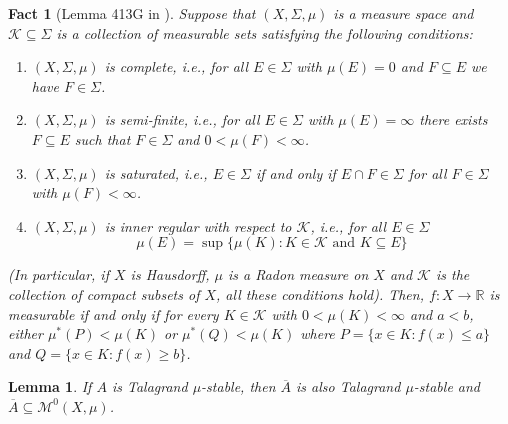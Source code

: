 \documentclass[psamsfonts]{amsart}
\newtheorem{lem}[thm]{Lemma}
\newtheorem{fact}[thm]{Fact}
\theoremstyle{definition}
\theoremstyle{remark}
\numberwithin{equation}{section}
\begin{document}
\begin{fact}[Lemma 413G in \cite{fremlin2003vol4}]\label{fact: measurable functions characterization}
    Suppose that $(X,\Sigma,\mu)$ is a measure space and $\mathcal{K}\subseteq\Sigma$ is a collection of measurable sets satisfying the following conditions:
    \begin{enumerate}
        \item $(X,\Sigma,\mu)$ is complete, i.e., for all $E\in\Sigma$ with $\mu(E)=0$ and $F\subseteq E$ we have $F\in\Sigma$.
        \item $(X,\Sigma,\mu)$ is semi-finite, i.e., for all $E\in\Sigma$ with $\mu(E)=\infty$ there exists $F\subseteq E$ such that $F\in\Sigma$ and $0<\mu(F)<\infty$.
        \item $(X,\Sigma,\mu)$ is saturated, i.e., $E\in\Sigma$ if and only if $E\cap F\in\Sigma$ for all $F\in\Sigma$ with $\mu(F)<\infty$.
        \item $(X,\Sigma,\mu)$ is inner regular with respect to $\mathcal{K}$, i.e., for all $E\in\Sigma$
        $$\mu(E)=\sup\{\mu(K):K\in\mathcal{K} \text{ and } K\subseteq E\}$$
    \end{enumerate}
    (In particular, if $X$ is Hausdorff, $\mu$ is a Radon measure on $X$ and $\mathcal{K}$ is the collection of compact subsets of $X$, all these conditions hold).
    Then, $f:X\rightarrow\mathbb{R}$ is measurable if and only if for every $K\in\mathcal{K}$ with $0<\mu(K)<\infty$ and $a<b$, either $\mu^*(P)<\mu(K)$ or $\mu^*(Q)<\mu(K)$ where $P=\{x\in K:f(x)\leq a\}$ and $Q=\{x\in K:f(x)\geq b\}$.
\end{fact}

\begin{lem}\label{talagrand stable is relatively compact}
    If $A$ is Talagrand $\mu$-stable, then $\overline{A}$ is also Talagrand $\mu$-stable and $\overline{A}\subseteq\mathscr{M}^0(X,\mu)$.
\end{lem}
\end{document}
